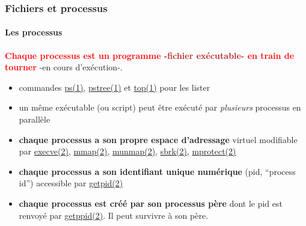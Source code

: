 \documentclass[xcolor=svgnames,final,smaller,a4]{beamer}
\begin{document}
\begin{frame}
  \frametitle{Fichiers et processus}
  \framesubtitle{Les processus}

     \textbf{\textcolor{red}{Chaque processus est un programme \textcolor{FireBrick}{-fichier exécutable-} en train de tourner}} -en cours
  d'exécution-.  {}

  \begin{relsize}{-0.5}
  \begin{itemize}

  \item commandes
    \href{https://man7.org/linux/man-pages/man1/ps.1.html}{ps(1)},
    \href{https://man7.org/linux/man-pages/man1/pstree.1.html}{pstree(1)}
    et \href{https://man7.org/linux/man-pages/man1/top.1.html}{top(1)}
    pour les lister {}
    
  \item un même exécutable (ou script) peut être exécuté par \emph{plusieurs}
    processus en parallèle {}

  \item \textbf{chaque processus a son propre espace d'adressage} virtuel modifiable par
  \href{https://man7.org/linux/man-pages/man2/execve.2.html}{execve(2)},
  \href{https://man7.org/linux/man-pages/man2/mmap.2.html}{mmap(2)},
  \href{https://man7.org/linux/man-pages/man2/munmap.2.html}{munmap(2)},
  \href{https://man7.org/linux/man-pages/man2/sbrk.2.html}{sbrk(2)},
  \href{https://man7.org/linux/man-pages/man2/mprotect.2.html}{mprotect(2)}

    \item \textbf{chaque processus a son identifiant unique numérique} (pid, ``process id'')
 accessible par \href{https://man7.org/linux/man-pages/man2/getpid.2.html}{getpid(2)}
    
    \item \textbf{chaque processus est créé par son processus père} {} dont le pid est renvoyé par
  \href{https://man7.org/linux/man-pages/man2/getppid.2.html}{getppid(2)}. Il peut survivre à son père.
    
  \end{itemize}
  \end{relsize}
  
\end{frame}
\end{document}
